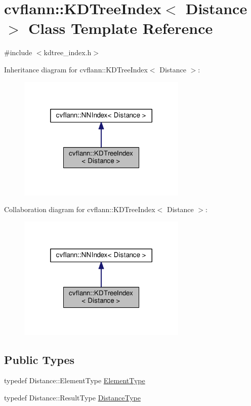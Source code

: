 \hypertarget{classcvflann_1_1KDTreeIndex}{\section{cvflann\-:\-:K\-D\-Tree\-Index$<$ Distance $>$ Class Template Reference}
\label{classcvflann_1_1KDTreeIndex}
}


{\ttfamily \#include $<$kdtree\-\_\-index.\-h$>$}



Inheritance diagram for cvflann\-:\-:K\-D\-Tree\-Index$<$ Distance $>$\-:\nopagebreak
\begin{figure}[H]
\begin{center}
\leavevmode
\includegraphics[width=228pt]{classcvflann_1_1KDTreeIndex__inherit__graph}
\end{center}
\end{figure}


Collaboration diagram for cvflann\-:\-:K\-D\-Tree\-Index$<$ Distance $>$\-:\nopagebreak
\begin{figure}[H]
\begin{center}
\leavevmode
\includegraphics[width=228pt]{classcvflann_1_1KDTreeIndex__coll__graph}
\end{center}
\end{figure}
\subsection*{Public Types}
\begin{DoxyCompactItemize}
\item 
typedef Distance\-::\-Element\-Type \hyperlink{classcvflann_1_1KDTreeIndex_a200ee43145794ee028f415f205934d24}{Element\-Type}
\item 
typedef Distance\-::\-Result\-Type \hyperlink{classcvflann_1_1KDTreeIndex_a10ed3a3afa91fed415ab7c2d1b7c4014}{Distance\-Type}
\end{DoxyCompactItemize}
